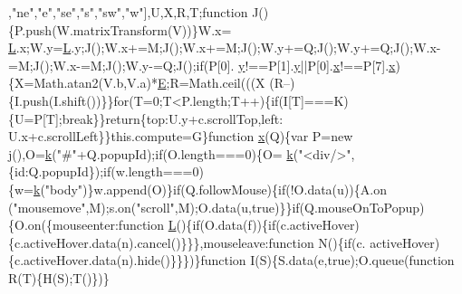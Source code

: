 \begin{DoxyCode}
{      ,\textcolor{stringliteral}{"ne"},\textcolor{stringliteral}{"e"},\textcolor{stringliteral}{"se"},\textcolor{stringliteral}{"s"},\textcolor{stringliteral}{"sw"},\textcolor{stringliteral}{"w"}],U,X,R,T;\textcolor{keyword}{function} J()\{P.push(W.matrixTransform(V))\}W.x=
      \hyperlink{jquery_8js_a38ee4c0b5f4fe2a18d0c783af540d253}{L}.x;W.y=\hyperlink{jquery_8js_a38ee4c0b5f4fe2a18d0c783af540d253}{L}.y;J();W.x+=M;J();W.x+=M;J();W.y+=Q;J();W.y+=Q;J();W.x-=M;J();W.x-=M;J();W.y-=Q;J();\textcolor{keywordflow}{if}(P[0].
      \hyperlink{sensor_8h_a0ed6a908288e0cd87f79c1b5ab56d07c}{y}!==P[1].\hyperlink{sensor_8h_a0ed6a908288e0cd87f79c1b5ab56d07c}{y}||P[0].\hyperlink{sensor_8h_a6c4b361d72eb3767ba424ac9a6ecf52b}{x}!==P[7].\hyperlink{sensor_8h_a6c4b361d72eb3767ba424ac9a6ecf52b}{x})\{X=Math.atan2(V.b,V.a)*\hyperlink{_l_c_d_8c_a07484107e6d9fdf38b53edf631d6511d}{E};R=Math.ceil(((X%
      (R--)\{I.push(I.shift())\}\}\textcolor{keywordflow}{for}(T=0;T<P.length;T++)\{\textcolor{keywordflow}{if}(I[T]===K)\{U=P[T];\textcolor{keywordflow}{break}\}\}\textcolor{keywordflow}{return}\{top:U.y+c.scrollTop,left:
      U.x+c.scrollLeft\}\}this.compute=G\}\textcolor{keyword}{function} \hyperlink{sensor_8h_a6c4b361d72eb3767ba424ac9a6ecf52b}{x}(Q)\{var P=\textcolor{keyword}{new} j(),O=\hyperlink{jquery_8js_ab26645c014aa005ecedef329ecf58c99}{k}(\textcolor{stringliteral}{"#"}+Q.popupId);\textcolor{keywordflow}{if}(O.length===0)\{O=
      \hyperlink{jquery_8js_ab26645c014aa005ecedef329ecf58c99}{k}(\textcolor{stringliteral}{"<div/>"},\{\textcolor{keywordtype}{id}:Q.popupId\});\textcolor{keywordflow}{if}(w.length===0)\{w=\hyperlink{jquery_8js_ab26645c014aa005ecedef329ecf58c99}{k}(\textcolor{stringliteral}{"body"})\}w.append(O)\}\textcolor{keywordflow}{if}(Q.followMouse)\{\textcolor{keywordflow}{if}(!O.data(u))\{A.on
      (\textcolor{stringliteral}{"mousemove"},M);s.on(\textcolor{stringliteral}{"scroll"},M);O.data(u,\textcolor{keyword}{true})\}\}\textcolor{keywordflow}{if}(Q.mouseOnToPopup)\{O.on(\{mouseenter:\textcolor{keyword}{function} 
      \hyperlink{jquery_8js_a38ee4c0b5f4fe2a18d0c783af540d253}{L}()\{\textcolor{keywordflow}{if}(O.data(f))\{\textcolor{keywordflow}{if}(c.activeHover)\{c.activeHover.data(n).cancel()\}\}\},mouseleave:\textcolor{keyword}{function} N()\{\textcolor{keywordflow}{if}(c.
      activeHover)\{c.activeHover.data(n).hide()\}\}\})\}\textcolor{keyword}{function} I(S)\{S.data(e,\textcolor{keyword}{true});O.queue(\textcolor{keyword}{function} R(T)\{H(S);T()\})\}\textcolor{keyword}{
}}
\end{DoxyCode}
